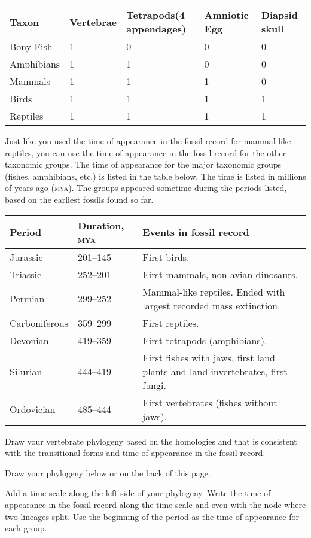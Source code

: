 \documentclass[12pt, hidelinks]{exam}
\begin{document}
\begin{questions}
\begin{longtable}[c]{@{}L{1in}C{1in}C{1in}C{1in}C{1in}@{}}
	\toprule
	Taxon 				&	Vertebrae	& Tetrapods\newline(4 appendages)	&	Amniotic Egg	& Diapsid skull \tabularnewline
	\midrule
	Bony Fish			& 1				&	0							& 0 						& 0 \tabularnewline
	Amphibians		& 1				&	1							& 0 						& 0 \tabularnewline
	Mammals			& 1				&	1							& 1 						& 0 \tabularnewline
	Birds					& 1				&	1							& 1 						& 1 \tabularnewline
	Reptiles			& 1				&	1							& 1 						& 1 \tabularnewline
	\bottomrule
\end{longtable}

\newpage

Just like you used the time of appearance in the fossil record for mammal-like reptiles, you can use the time of appearance in the fossil record for the other taxonomic groups. The time of appearance for the major taxonomic groups (fishes, amphibians, etc.) is listed in the table below. The time is listed in millions of years ago (\textsc{mya}). The groups appeared sometime during the periods listed, based on the earliest fossils found so far.

\begin{longtable}[c]{@{}L{1in}L{1.5in}L{2.5in}@{}}
\toprule
Period	& Duration, \textsc{mya} 	&	Events in fossil record \tabularnewline
\midrule
Jurassic			&	201–145	&	First birds.  \tabularnewline
Triassic				&	252–201	&	First mammals, non-avian dinosaurs. \tabularnewline
Permian			&	299–252	&	Mammal-like reptiles. Ended with largest recorded mass extinction. \tabularnewline
Carboniferous	&	359–299	&	First reptiles. \tabularnewline
Devonian			&	419–359	&	First tetrapods (amphibians). \tabularnewline
Silurian				&	444–419	&	First fishes with jaws, first land plants and land invertebrates, first fungi. \tabularnewline
Ordovician		&	485–444	&	First vertebrates (fishes without jaws). \tabularnewline
\bottomrule
\end{longtable}

\question
Draw your vertebrate phylogeny based on the homologies and that is consistent with the transitional forms and time of appearance in the fossil record. 

Draw your phylogeny below or on the back of this page.

\question
Add a time scale along the left side of your phylogeny. Write the time of appearance in the fossil record along the time scale and even with the node where two lineages split. Use the beginning of the period as the time of appearance for each group.


\end{questions}
\end{document}
